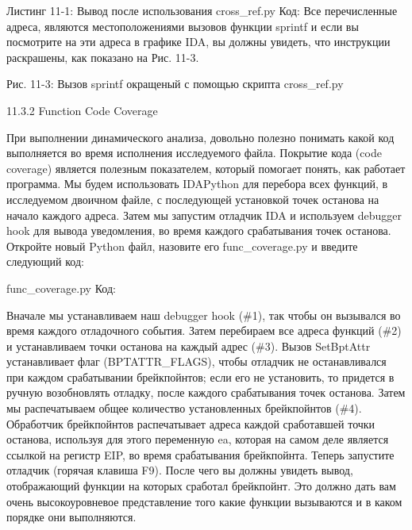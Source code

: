 \documentclass[12pt]{book}
\begin{document}
Листинг 11-1: Вывод после использования cross\_ref.py
Код:
Все перечисленные адреса, являются местоположениями вызовов функции sprintf и если вы посмотрите на эти адреса в графике IDA, вы должны увидеть, что инструкции раскрашены, как показано на Рис. 11-3.


Рис. 11-3: Вызов sprintf окращеный с помощью скрипта cross\_ref.py

11.3.2 Function Code Coverage

При выполнении динамического анализа, довольно полезно понимать какой код выполняется во время исполнения исследуемого файла. Покрытие кода (code coverage) является полезным показателем, который помогает понять, как работает программа. Мы будем использовать IDAPython для перебора всех функций, в исследуемом двоичном файле, с последующей установкой точек останова на начало каждого адреса. Затем мы запустим отладчик IDA и используем debugger hook для вывода уведомления, во время каждого срабатывания точек останова. Откройте новый Python файл, назовите его func\_coverage.py и введите следующий код: 

func\_coverage.py
Код:

    





Вначале мы устанавливаем наш debugger hook (\#1), так чтобы он вызывался во время каждого отладочного события. Затем перебираем все адреса функций (\#2) и устанавливаем точки останова на каждый адрес (\#3). Вызов SetBptAttr устанавливает флаг (BPTATTR\_FLAGS), чтобы отладчик не останавливался при каждом срабатывании брейкпойнтов; если его не установить, то придется в ручную возобновлять отладку, после каждого срабатывания точек останова. Затем мы распечатываем общее количество установленных брейкпойнтов (\#4). Обработчик брейкпойнтов распечатывает адреса каждой сработавшей точки останова, используя для этого переменную ea, которая на самом деле является ссылкой на регистр EIP, во время срабатывания брейкпойнта. Теперь запустите отладчик (горячая клавиша F9). После чего вы должны увидеть вывод, отображающий функции на которых сработал брейкпойнт. Это должно дать вам очень высокоуровневое представление того какие функции вызываются и в каком порядке они выполняются.
\end{document}
